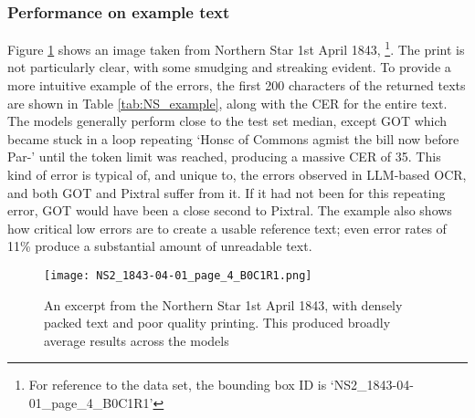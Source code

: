 \documentclass{article} %
\begin{document}
\subsubsection{Performance on example text}

Figure \ref{fig:image_example} shows an image taken from Northern Star 1st April 1843,  \footnote{For reference to the data set, the bounding box ID is `NS2\_1843-04-01\_page\_4\_B0C1R1'}. The print is not particularly clear, with some smudging and streaking evident. To provide a more intuitive example of the errors, the first 200 characters of the returned texts are shown in Table \ref{tab:NS_example}, along with the CER for the entire text. The models generally perform close to the test set median, except GOT which became stuck in a loop repeating `Honsc of Commons agmist the bill now before Par-' until the token limit was reached, producing a massive CER of 35. This kind of error is typical of, and unique to, the errors observed in LLM-based OCR, and both GOT and Pixtral suffer from it. If it had not been for this repeating error, GOT would have been a close second to Pixtral. The example also shows how critical low errors are to create a usable reference text; even error rates of 11\% produce a substantial amount of unreadable text.


\begin{figure}
    \centering
    \texttt{[image: NS2\_1843-04-01\_page\_4\_B0C1R1.png]}
    \caption{An excerpt from the Northern Star 1st April 1843, with densely packed text and poor quality printing. This produced broadly average results across the models}
    \label{fig:image_example}
\end{figure}
\end{document}
